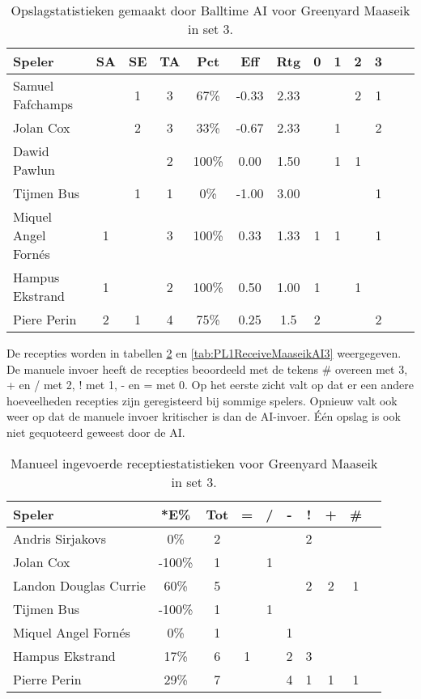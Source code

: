 \begin{table}[ht!]
  \centering
  \scriptsize
  \begin{tabular}{|l|c|c|c|c|c|c|c|c|c|c|c|c|} \hline
    \textbf{Speler} & SA & SE & TA & Pct & Eff & Rtg & 0 & 1 & 2 & 3  \\ \hline
    Samuel Fafchamps &  & 1 & 3 & 67\% & -0.33 & 2.33 &   &   & 2 & 1 \\
    Jolan Cox &  & 2 & 3 & 33\% & -0.67 & 2.33 &   & 1 &   & 2 \\
    Dawid Pawlun &  &  & 2 & 100\% & 0.00 & 1.50 &   & 1 & 1 &  \\
    Tijmen Bus &  & 1 & 1 & 0\% & -1.00 & 3.00 &   & &   &  1 \\
    Miquel Angel Fornés & 1 &  & 3 & 100\% & 0.33 & 1.33 & 1 & 1 &   & 1 \\
    Hampus Ekstrand & 1 &  & 2 & 100\% & 0.50 & 1.00 & 1 &   & 1 &  \\
    Piere Perin & 2 & 1 & 4 & 75\% & 0.25 & 1.5 & 2 &   &   & 2 \\ \hline
  \end{tabular}
  \caption[Opslagstatistieken gemaakt door Balltime AI voor Greenyard Maaseik in set 3]{\label{tab:PL1ServeMaaseikAI3}Opslagstatistieken gemaakt door Balltime AI voor Greenyard Maaseik in set 3.}
\end{table}

De recepties worden in tabellen \ref{tab:PL1ReceiveMaaseikMan3} en \ref{tab:PL1ReceiveMaaseikAI3} weergegeven. De manuele invoer heeft de recepties beoordeeld met de tekens \# overeen met 3, + en / met 2, ! met 1, - en = met 0. Op het eerste zicht valt op dat er een andere hoeveelheden recepties zijn geregisteerd bij sommige spelers. Opnieuw valt ook weer op dat de manuele invoer kritischer is dan de AI-invoer. Één opslag is ook niet gequoteerd geweest door de AI.

\begin{table}[ht!]
  \centering
  \scriptsize
  \begin{tabular}{|l|c|c|c|c|c|c|c|c|c|}
    \hline
    \textbf{Speler}& *E\% & Tot & = & / & - & ! & + & \#\\ \hline
    Andris Sirjakovs & 0\% & 2 &  &  &  & 2 &  &  \\ 
    Jolan Cox & -100\% & 1 &  & 1 &  &  &  &  \\
    Landon Douglas Currie & 60\% & 5 &  &  &  & 2 & 2 & 1 \\
    Tijmen Bus & -100\% & 1 &  & 1 &  &  &  &  \\ 
    Miquel Angel Fornés & 0\% & 1 &  &  & 1 &  &  &  \\ 
    Hampus Ekstrand & 17\% & 6 & 1 &  & 2 & 3 &  &  \\ 
    Pierre Perin & 29\% & 7 &  &  & 4 & 1 & 1 & 1 \\ \hline
  \end{tabular}
  \caption[Manueel ingevoerde receptiestatistieken voor Greenyard Maaseik in set 3]{\label{tab:PL1ReceiveMaaseikMan3}Manueel ingevoerde receptiestatistieken voor Greenyard Maaseik in set 3.}
\end{table}

